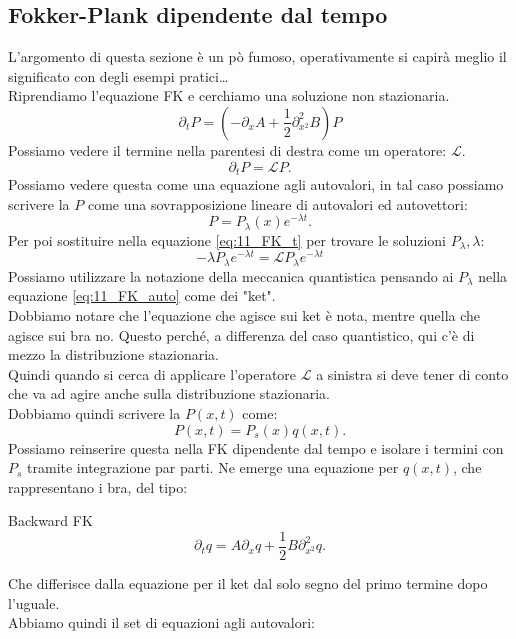 \subsection{Fokker-Plank dipendente dal tempo}%
\label{sub:Fokker-Plank dipendente dal tempo}
L'argomento di questa sezione è un pò fumoso, operativamente si capirà meglio il significato con degli esempi pratici\ldots\\
Riprendiamo l'equazione FK e cerchiamo una soluzione non stazionaria.
\begin{equation}
    \partial_{t}P = \left(-\partial_{x}A + \frac{1}{2}\partial^2_{x^2} B\right)P 
    \label{eq:11_FK_t}
\end{equation}
Possiamo vedere il termine nella parentesi di destra come un operatore: $\mathcal{L}$.
\[
    \partial_{t}P = \mathcal{L}P
.\] 
Possiamo vedere questa come una equazione agli autovalori, in tal caso possiamo scrivere la $P$ come una sovrapposizione lineare di autovalori ed autovettori:
\[
    P = P_\lambda (x) e^{-\lambda t}
.\] 
Per poi sostituire nella equazione \ref{eq:11_FK_t} per trovare le soluzioni $P_\lambda, \lambda$:
\begin{equation}
    -\lambda P_\lambda  e^{-\lambda t} = \mathcal{L}P_\lambda  e^{-\lambda t}
    \label{eq:11_FK_auto}
\end{equation}
Possiamo utilizzare la notazione della meccanica quantistica pensando ai $P_\lambda$ nella equazione \ref{eq:11_FK_auto} come dei "ket". \\
Dobbiamo notare che l'equazione che agisce sui ket è nota, mentre quella che agisce sui bra no. Questo perché, a differenza del caso quantistico, qui c'è di mezzo la distribuzione stazionaria. \\
Quindi quando si cerca di applicare l'operatore $\mathcal{L}$ a sinistra si deve tener di conto che va ad agire anche sulla distribuzione stazionaria.\\
Dobbiamo quindi scrivere la $P(x,t)$ come:
\[
    P(x,t) = P_s(x) q(x,t) 
.\] 
Possiamo reinserire questa nella FK dipendente dal tempo e isolare i termini con $P_s$  tramite integrazione par parti. Ne emerge una equazione per $q(x,t)$, che rappresentano i bra, del tipo:
\begin{redbox}{Backward FK}
\[
    \partial_{t}q = A\partial_{x}q + \frac{1}{2}B\partial^2_{x^2}q
.\]     
\end{redbox}
\noindent
Che differisce dalla equazione per il ket dal solo segno del primo termine dopo l'uguale. \\
Abbiamo quindi il set di equazioni agli autovalori:
